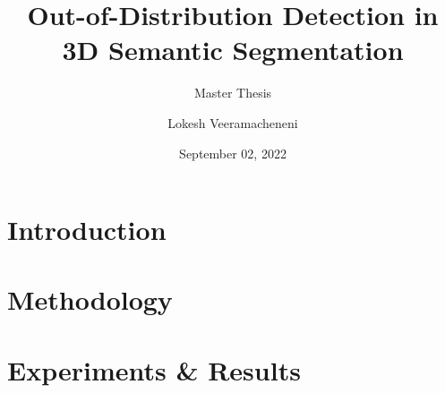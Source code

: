 \documentclass[aspectratio=169]{beamer}
\author[Veeramacheneni]{Lokesh Veeramacheneni}
\title{Out-of-Distribution Detection in 3D Semantic Segmentation}
\subtitle{Master Thesis}
\institute[HBRS]{Hochschule Bonn-Rhein-Sieg}
\date{September 02, 2022}
\begin{document}
{
\begin{frame}
\titlepage
\end{frame}
}

\section{Introduction}
\section{Methodology}
\section{Experiments \& Results}
\end{document}
